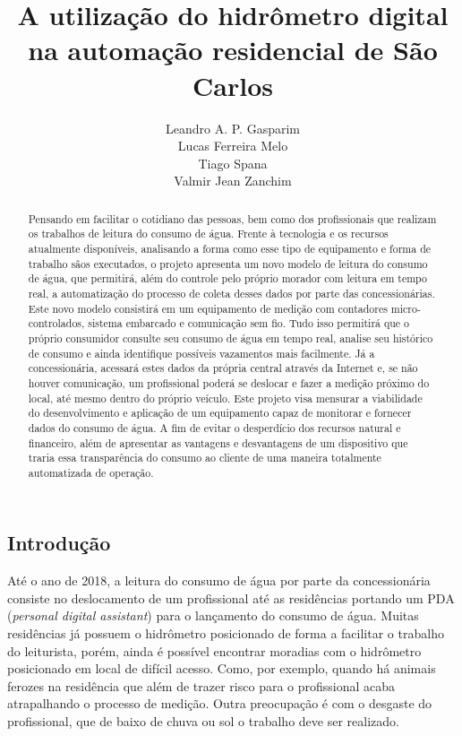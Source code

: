 \documentclass[
	article,			%
	11pt,				%
	oneside,			%
	a4paper,			%
	english,			%
	brazil,				%
	sumario=tradicional,
	doublespacing
	]{abntex2}
\title{A utilização do hidrômetro digital na automação residencial de São Carlos}
\author{
    Leandro A. P. Gasparim \\
    Lucas Ferreira Melo \\
    Tiago Spana \\
    Valmir Jean Zanchim \\
}
\date{}
\begin{document}
\maketitle
\begin{DoubleSpace}
\begin{abstract}
   Pensando em facilitar o cotidiano das pessoas, bem como dos profissionais que realizam os trabalhos de leitura do consumo de água. Frente à tecnologia e os recursos atualmente disponíveis, analisando a forma como esse tipo de equipamento e forma de trabalho sãos executados, o projeto apresenta um novo modelo de leitura do consumo de água, que permitirá, além do controle pelo próprio morador com leitura em tempo real, a automatização do processo de coleta desses dados por parte das concessionárias. Este novo modelo consistirá em um equipamento de medição com contadores micro-controlados, sistema embarcado e comunicação sem fio. Tudo isso permitirá que o próprio consumidor consulte seu consumo de água em tempo real, analise seu histórico de consumo e ainda identifique possíveis vazamentos mais facilmente. Já a concessionária, acessará estes dados da própria central através da Internet e, se não houver comunicação, um profissional poderá se deslocar e fazer a medição próximo do local, até mesmo dentro do próprio veículo.
   Este projeto visa mensurar a viabilidade do desenvolvimento e aplicação de um equipamento capaz de monitorar e fornecer dados do consumo de água. A fim de evitar o desperdício dos recursos natural e financeiro, além de apresentar as vantagens e desvantagens de um dispositivo que traria essa transparência do consumo ao cliente de uma maneira totalmente automatizada de operação.
    
\end{abstract}
\newpage

\section{Introdução}

    Até o ano de 2018, a leitura do consumo de água por parte da concessionária consiste no deslocamento de um profissional até as residências portando um PDA (\textit{personal digital assistant}) para o lançamento do consumo de água. Muitas residências já possuem o hidrômetro posicionado de forma a facilitar o trabalho do leiturista, porém, ainda é possível encontrar moradias com o hidrômetro posicionado em local de difícil acesso. Como, por exemplo, quando há animais ferozes na residência que além de trazer risco para o profissional acaba atrapalhando o processo de medição. Outra preocupação é com o desgaste do profissional, que de baixo de chuva ou sol o trabalho deve ser realizado.
    

\end{DoubleSpace}
\end{document}
